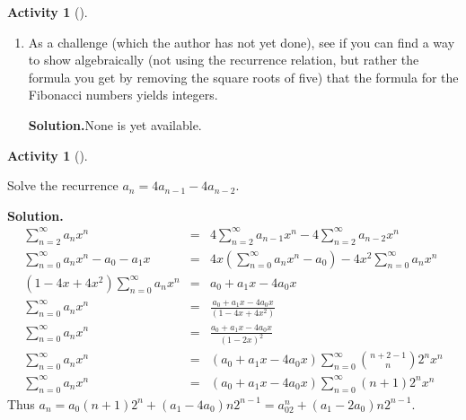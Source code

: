 \documentclass[10pt,]{book}
\theoremstyle{plain}
\theoremstyle{definition}
\newtheorem{activity}[project]{Activity}
\numberwithin{equation}{chapter}
\newcommand{\amp}{&}
\begin{document}
\begin{activity}[]
\begin{enumerate}[label=(\alph*)]
~\par
\item As a challenge (which the author has not yet done), see if you can find a way to show algebraically (not using the recurrence relation, but rather the formula you get by removing the square roots of five) that the formula for the Fibonacci numbers yields integers.%
\par\medskip\noindent%
\textbf{Solution.}\quad None is yet available.%

\end{enumerate}
\end{activity}
\begin{activity}[]\label{activity-195}
\item Solve the recurrence \(a_n= 4a_{n-1} - 4a_{n-2}\).%
\par\medskip\noindent%
\textbf{Solution.}\quad %
\begin{align*}
\sum_{n=2}^\infty a_nx^n \amp =\amp  4\sum_{n=2}^\infty a_{n-1}x^n -
4\sum_{n=2}^\infty a_{n-2}x^n\\
\sum_{n=0}^\infty a_nx^n -a_0-a_1x \amp =\amp  4x(\sum_{n=0}^\infty a_{n}x^n
-a_0) - 4x^2\sum_{n=0}^\infty a_{n}x^n\\
(1-4x+4x^2)\sum_{n=0}^\infty a_nx^n  \amp =\amp  
a_0+a_1x-4a_0x\\
\sum_{n=0}^\infty a_nx^n\amp =\amp \frac{a_0+a_1x-4a_0x}{(1-4x+4x^2)}\\
\sum_{n=0}^\infty a_nx^n\amp =\amp \frac{a_0+a_1x-4a_0x}{(1-2x)^2}\\
\sum_{n=0}^\infty a_nx^n\amp =\amp (a_0+a_1x-4a_0x)\sum_{n=0}^\infty \binom{n+2-1}{n}
2^nx^n\\
\sum_{n=0}^\infty a_nx^n\amp =\amp (a_0+a_1x-4a_0x)\sum_{n=0}^\infty (n+1)
2^nx^n
\end{align*}
Thus \(a_n=a_0(n+1)2^n
+(a_1-4a_0)n2^{n-1}=a_02^n+(a_1-2a_0)n2^{n-1}\).%
\end{activity}
\typeout{************************************************}
\typeout{************************************************}
\end{document}
